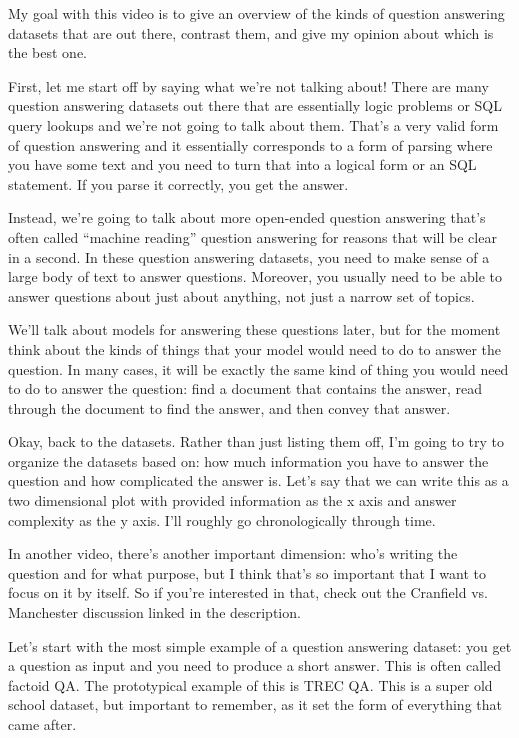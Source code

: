 
My goal with this video is to give an overview of the kinds of question answering datasets that are out there, contrast them, and give my opinion about which is the best one.

First, let me start off by saying what we're not talking about!  There are many question answering datasets out there that are essentially logic problems or SQL query lookups and we're not going to talk about them.  That's a very valid form of question answering and it essentially corresponds to a form of parsing where you have some text and you need to turn that into a logical form or an SQL statement.  If you parse it correctly, you get the answer.

Instead, we're going to talk about more open-ended question answering that’s often called “machine reading” question answering for reasons that will be clear in a second.  In these question answering datasets, you need to make sense of a large body of text to answer questions.  Moreover, you usually need to be able to answer questions about just about anything, not just a narrow set of topics.

We'll talk about models for answering these questions later, but for the moment think about the kinds of things that your model would need to do to answer the question.  In many cases, it will be exactly the same kind of thing you would need to do to answer the question: find a document that contains the answer, read through the document to find the answer, and then convey that answer.

Okay, back to the datasets.  Rather than just listing them off, I’m going to try to organize the datasets based on: how much information you have to answer the question and how complicated the answer is.  Let’s say that we can write this as a two dimensional plot with provided information as the x axis and answer complexity as the y axis.  I’ll roughly go chronologically through time.

In another video, there’s another important dimension: who’s writing the question and for what purpose, but I think that’s so important that I want to focus on it by itself.  So if you’re interested in that, check out the Cranfield vs. Manchester discussion linked in the description. 

Let’s start with the most simple example of a question answering dataset: you get a question as input and you need to produce a short answer.  This is often called factoid QA.  The prototypical example of this is TREC QA.  This is a super old school dataset, but important to remember, as it set the form of everything that came after.

